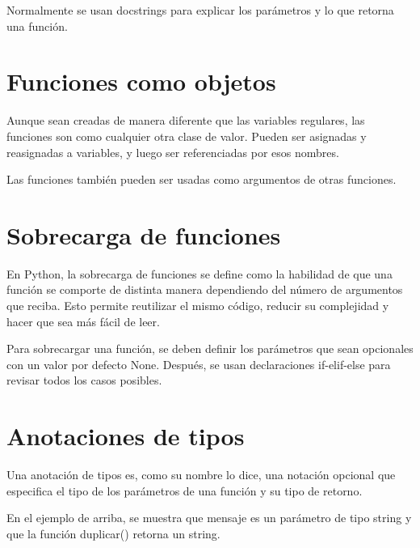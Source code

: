 \documentclass{report}
\begin{document}
Normalmente se usan docstrings para explicar los parámetros y lo que retorna una función.


\section{Funciones como objetos}

Aunque sean creadas de manera diferente que las variables regulares, las funciones son como cualquier otra clase de valor. Pueden ser asignadas y reasignadas a variables, y luego ser referenciadas por esos nombres.


Las funciones también pueden ser usadas como argumentos de otras funciones.


\section{Sobrecarga de funciones}

En Python, la sobrecarga de funciones se define como la habilidad de que una función se comporte de distinta manera dependiendo del número de argumentos que reciba. Esto permite reutilizar el mismo código, reducir su complejidad y hacer que sea más fácil de leer.\smallskip

Para sobrecargar una función, se deben definir los parámetros que sean opcionales con un valor por defecto None. Después, se usan declaraciones if-elif-else para revisar todos los casos posibles.



\section{Anotaciones de tipos}

Una anotación de tipos es, como su nombre lo dice, una notación opcional que especifica el tipo de los parámetros de una función y su tipo de retorno.


En el ejemplo de arriba, se muestra que mensaje es un parámetro de tipo string y que la función duplicar() retorna un string.\smallskip
\end{document}
